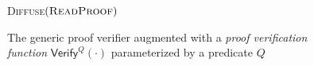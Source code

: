 \begin{figure}[t]
\begin{algorithm}[H]
    \caption{\label{alg.generic-verifier} The generic proof verifier augmented
        with a{ \em proof verification function} $\textsf{Verify}^Q(\cdot)$
        parameterized by a predicate $Q$}
    \begin{algorithmic}[1]
        \If{$\Pi \neq \emptyset$}
        \EndIf
            \State\textsc{Diffuse}{$(\textsc{ReadProof})$}
        \EndIf
        \vskip8pt
    \end{algorithmic}
\end{algorithm}
\end{figure}
